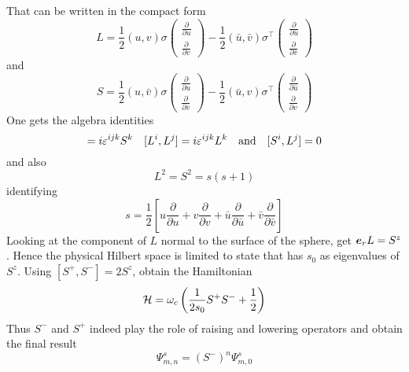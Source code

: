 		That can be written in the compact form
		\begin{equation}
		   L = \frac{1}{2}(u,v)\sigma \begin{pmatrix} \frac{\partial}{\partial u}\\
		\frac{\partial}{\partial v}
		\end{pmatrix} - \frac{1}{2}(\bar{u},\bar{v})\sigma^\top \begin{pmatrix} \frac{\partial}{\partial \bar{u}}\\
		\frac{\partial}{\partial \bar{v}}
		\end{pmatrix}
		\end{equation}
		and
		\begin{equation}
		   S = \frac{1}{2}(u,\bar{v})\sigma \begin{pmatrix} \frac{\partial}{\partial u}\\
		\frac{\partial}{\partial \bar{v}}
		\end{pmatrix} - \frac{1}{2}(\bar{u},v)\sigma^\top \begin{pmatrix} \frac{\partial}{\partial \bar{u}}\\
		\frac{\partial}{\partial v}
		\end{pmatrix}
		\end{equation}
		One gets the algebra identities
		\begin{equation}
		  [S^i,S^j] = i\varepsilon^{ijk}S^k \quad
		  [L^i,L^j] = i\varepsilon^{ijk}L^k \qq{and}
		  [S^i,L^j] = 0
		\end{equation}
		and also 
		\begin{equation}
		  L^2 = S^2 = s(s+1)
		\end{equation}
		identifying
		\begin{equation}
		  s = \frac{1}{2}\left[u\frac{\partial}{\partial u} + v\frac{\partial}{\partial v} + \bar{u}\frac{\partial}{\partial \bar{u}} + \bar{v}\frac{\partial}{\partial \bar{v}} \right]
		\end{equation}
		Looking at the component of $L$ normal to the surface of the sphere, get $\vb* e_r L = S^z$. Hence the physical Hilbert space is limited to state that has $s_0$ as eigenvalues of $S^z$. Using $[S^+,S^-] = 2S^z$, obtain the Hamiltonian 
		\begin{equation}
		  \mathcal H = \omega_c\left(\frac{1}{2s_0}S^+S^{-} + \frac{1}{2}\right)
		\end{equation}
		Thus $S^-$ and $S^+$ indeed play the role of raising and lowering operators and obtain the final result
		\begin{equation}
		\Psi^s_{m,n} = (S^-)^n\Psi^s_{m,0}
		\end{equation}

